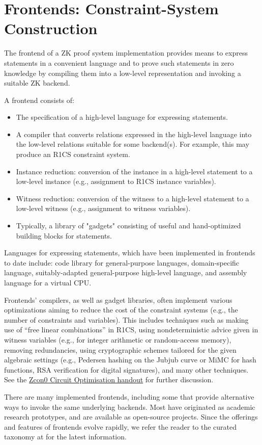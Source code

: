 \section{Frontends: Constraint-System Construction}
\label{implem:frontends}

The frontend of a ZK proof system implementation provides means to express statements in a convenient language and to prove such statements in zero knowledge by compiling them into a low-level representation and invoking a suitable ZK backend.

A frontend consists of:
\begin{itemize}
\item The specification of a high-level language for expressing statements.
\item A compiler that converts relations expressed in the high-level language into the low-level relations suitable for some backend(s). For example, this may produce an R1CS constraint system.
\item Instance reduction: conversion of the instance in a high-level statement to a low-level instance (e.g., assignment to R1CS instance variables).
\item Witness reduction: conversion of the witness to a high-level statement to a low-level witness (e.g., assignment to witness variables).
\item Typically, a library of "gadgets" consisting of useful and hand-optimized building blocks for statements.
\end{itemize}		

Languages for expressing statements, which have been implemented in frontends to date include: code library for general-purpose languages, domain-specific language, suitably-adapted general-purpose high-level language, and assembly language for a virtual CPU.

Frontends’ compilers, as well as gadget libraries, often implement various optimizations aiming to reduce the cost of the constraint systems (e.g., the number of constraints and variables). This includes techniques such as making use of “free linear combinations” in R1CS, using nondeterministic advice given in witness variables (e.g., for integer arithmetic or random-access memory), removing redundancies, using cryptographic schemes tailored for the given algebraic settings (e.g., Pedersen hashing on the Jubjub curve or MiMC for hash functions, RSA verification for digital signatures), and many other techniques. See the \href{https://docs.google.com/document/d/1aZ1GUAJOBFuqD4GOo9HqAH8w4xJo7HM4Bjte5-wkdnU/edit?usp=sharing}{Zcon0 Circuit Optimisation handout} for further discussion.

There are many implemented frontends, including some that provide alternative ways to invoke the same underlying backends. Most have originated as academic research prototypes, and are available as open-source projects. Since the offerings and features of frontends evolve rapidly, we refer the reader to the curated taxonomy at  for the latest information.

